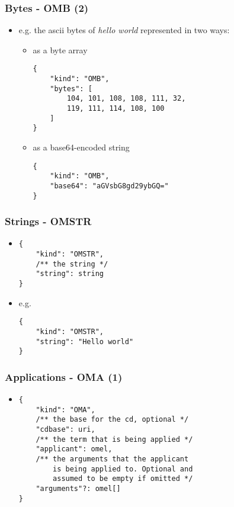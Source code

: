 \documentclass[usenames,dvipsnames]{beamer}
\begin{document}
\begin{frame}[fragile]
    \frametitle{Bytes - OMB (2)}
    \begin{itemize}
    \item e.g. the ascii bytes of \textit{hello world} represented in two ways:
    \begin{itemize}
            \item as a byte array
\begin{lstlisting}
{
    "kind": "OMB",
    "bytes": [
        104, 101, 108, 108, 111, 32, 
        119, 111, 114, 108, 100
    ]
}
\end{lstlisting}
            \item as a base64-encoded string
\begin{lstlisting}
{
    "kind": "OMB",
    "base64": "aGVsbG8gd29ybGQ="
}
\end{lstlisting}
        \end{itemize}
    \end{itemize}
\end{frame}

\begin{frame}[fragile]
    \frametitle{Strings - OMSTR}
    \begin{itemize}
        \item
\begin{lstlisting}
{
    "kind": "OMSTR", 
    /** the string */
    "string": string
}
\end{lstlisting}
        \item e.g. \begin{lstlisting}
{
    "kind": "OMSTR", 
    "string": "Hello world"
}
\end{lstlisting}
    \end{itemize}
\end{frame}

\begin{frame}[fragile]
    \frametitle{Applications - OMA (1)}
    \begin{itemize}
        \item
\begin{lstlisting}
{
    "kind": "OMA", 
    /** the base for the cd, optional */
    "cdbase": uri, 
    /** the term that is being applied */
    "applicant": omel, 
    /** the arguments that the applicant 
        is being applied to. Optional and
        assumed to be empty if omitted */
    "arguments"?: omel[]
}
\end{lstlisting}
    \end{itemize}
\end{frame}
\end{document}
